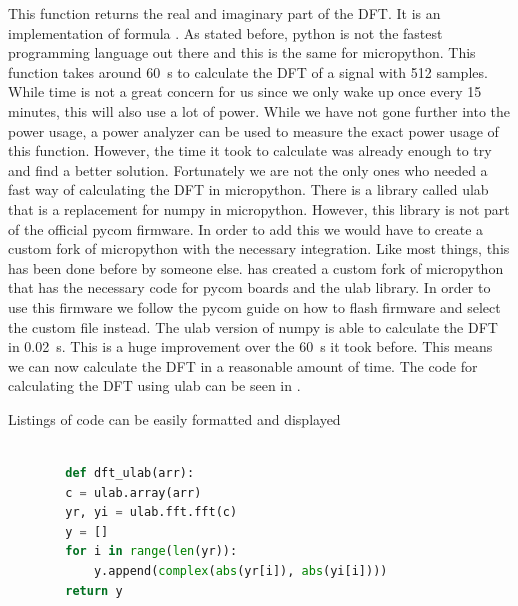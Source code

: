     This function returns the real and imaginary part of the DFT. It is an implementation of formula . As stated before, python is not the fastest programming language out there and this is the same for micropython. This function takes around 60~s to calculate the DFT of a signal with 512 samples. While time is not a great concern for us since we only wake up once every 15 minutes, this will also use a lot of power. While we have not gone further into the power usage, a power analyzer can be used to measure the exact power usage of this function. However, the time it took to calculate was already enough to try and find a better solution. Fortunately we are not the only ones who needed a fast way of calculating the DFT in micropython. There is a library called ulab that is a replacement for numpy in micropython. However, this library is not part of the official pycom firmware. In order to add this we would have to create a custom fork of micropython with the necessary integration. Like most things, this has been done before by someone else. \cite{chenPythonImplementationDFT} has created a custom fork of micropython that has the necessary code for pycom boards and the ulab library. In order to use this firmware we follow the pycom guide on how to flash firmware and select the custom file instead. The ulab version of numpy is able to calculate the DFT in 0.02~s. This is a huge improvement over the 60~s it took before. This means we can now calculate the DFT in a reasonable amount of time. The code for calculating the DFT using ulab can be seen in .

    \begin{frame}[fragile]{Listings of code can be easily formatted and displayed}
      \begin{lstlisting}[language=Python, caption={ulab DFT method},label={list: ulab DFT}]
      
        def dft_ulab(arr):
        c = ulab.array(arr)
        yr, yi = ulab.fft.fft(c)
        y = []
        for i in range(len(yr)):
            y.append(complex(abs(yr[i]), abs(yi[i])))
        return y

      \end{lstlisting}
    \end{frame}


